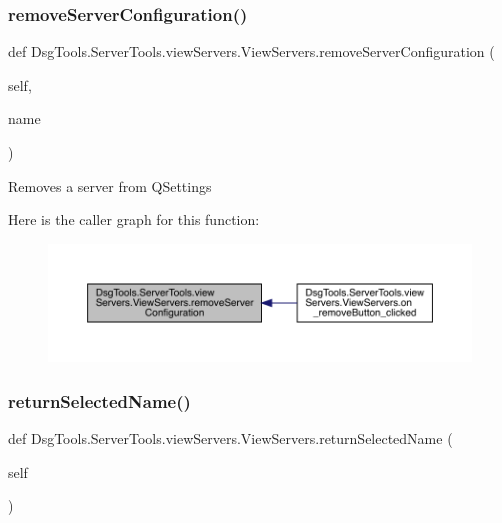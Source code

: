 \subsubsection{\texorpdfstring{remove\+Server\+Configuration()}{removeServerConfiguration()}}
{\footnotesize\ttfamily def Dsg\+Tools.\+Server\+Tools.\+view\+Servers.\+View\+Servers.\+remove\+Server\+Configuration (\begin{DoxyParamCaption}\item[{}]{self,  }\item[{}]{name }\end{DoxyParamCaption})}

\begin{DoxyVerb}Removes a server from QSettings
\end{DoxyVerb}
 Here is the caller graph for this function\+:
\nopagebreak
\begin{figure}[H]
\begin{center}
\leavevmode
\includegraphics[width=350pt]{class_dsg_tools_1_1_server_tools_1_1view_servers_1_1_view_servers_ac1337507461537612e927a8171c3afef_icgraph}
\end{center}
\end{figure}
\mbox{\label{class_dsg_tools_1_1_server_tools_1_1view_servers_1_1_view_servers_a0be08903e376224c84b40183e1cfd327}} 
\subsubsection{\texorpdfstring{return\+Selected\+Name()}{returnSelectedName()}}
{\footnotesize\ttfamily def Dsg\+Tools.\+Server\+Tools.\+view\+Servers.\+View\+Servers.\+return\+Selected\+Name (\begin{DoxyParamCaption}\item[{}]{self }\end{DoxyParamCaption})}

